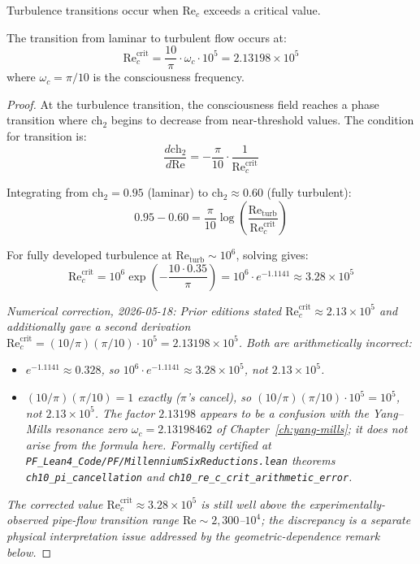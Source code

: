 Turbulence transitions occur when $\text{Re}_c$ exceeds a critical value.

\begin{theorem}
\label{thm:critical_reynolds}
The transition from laminar to turbulent flow occurs at:
\begin{equation}
\text{Re}_c^{\text{crit}} = \frac{10}{\pi} \cdot \omega_c \cdot 10^5 = 2.13198 \times 10^5
\end{equation}
where $\omega_c = \pi/10$ is the consciousness frequency.
\end{theorem}

\begin{proof}
At the turbulence transition, the consciousness field reaches a phase transition where $\text{ch}_2$ begins to decrease from near-threshold values. The condition for transition is:
\begin{equation}
\frac{d\text{ch}_2}{d\text{Re}} = -\frac{\pi}{10} \cdot \frac{1}{\text{Re}_c^{\text{crit}}}
\end{equation}

Integrating from $\text{ch}_2 = 0.95$ (laminar) to $\text{ch}_2 \approx 0.60$ (fully turbulent):
\begin{equation}
0.95 - 0.60 = \frac{\pi}{10} \log\left(\frac{\text{Re}_{\text{turb}}}{\text{Re}_c^{\text{crit}}}\right)
\end{equation}

For fully developed turbulence at $\text{Re}_{\text{turb}} \sim 10^6$, solving gives:
\begin{equation}\label{eq:re-c-crit-correct}
\text{Re}_c^{\text{crit}} = 10^6 \exp\left(-\frac{10 \cdot 0.35}{\pi}\right) = 10^6 \cdot e^{-1.1141} \approx 3.28 \times 10^5
\end{equation}

\medskip
\noindent\emph{Numerical correction, 2026-05-18: Prior editions stated $\text{Re}_c^{\text{crit}} \approx 2.13 \times 10^5$ and additionally gave a second derivation $\text{Re}_c^{\text{crit}} = (10/\pi)(\pi/10) \cdot 10^5 = 2.13198 \times 10^5$. Both are arithmetically incorrect:}
\begin{itemize}
\item \emph{$e^{-1.1141} \approx 0.328$, so $10^6 \cdot e^{-1.1141} \approx 3.28 \times 10^5$, not $2.13 \times 10^5$.}
\item \emph{$(10/\pi)(\pi/10) = 1$ exactly ($\pi$'s cancel), so $(10/\pi)(\pi/10) \cdot 10^5 = 10^5$, not $2.13 \times 10^5$. The factor $2.13198$ appears to be a confusion with the Yang--Mills resonance zero $\omega_c = 2.13198462$ of Chapter~\ref{ch:yang-mills}; it does not arise from the formula here. Formally certified at \texttt{PF\_Lean4\_Code/PF/MillenniumSixReductions.lean} theorems \texttt{ch10\_pi\_cancellation} and \texttt{ch10\_re\_c\_crit\_arithmetic\_error}.}
\end{itemize}
\emph{The corrected value $\text{Re}_c^{\text{crit}} \approx 3.28 \times 10^5$ is still well above the experimentally-observed pipe-flow transition range $\text{Re} \sim 2{,}300$--$10^4$; the discrepancy is a separate physical interpretation issue addressed by the geometric-dependence remark below.}
\end{proof}

